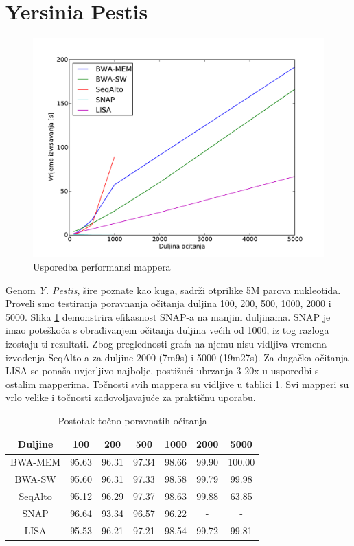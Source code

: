 \documentclass[times, utf8, diplomski]{fer}
\begin{document}
\section {Yersinia Pestis}

\begin{figure}[H]
\centering
\includegraphics[width=1.0\textwidth]{../img/yersinia-time.pdf}
\caption{Usporedba performansi mappera}\label{yersinia-time}
\end{figure}

Genom \emph{Y. Pestis}, šire poznate kao kuga, sadrži otprilike 5M parova nukleotida. Proveli smo testiranja poravnanja očitanja duljina 100, 200, 500, 1000, 2000 i 5000. Slika \ref{yersinia-time} demonstrira efikasnost SNAP-a na manjim duljinama. SNAP je imao poteškoća s obrađivanjem očitanja duljina većih od 1000, iz tog razloga izostaju ti rezultati. Zbog preglednosti grafa na njemu nisu vidljiva vremena izvođenja SeqAlto-a za duljine 2000 (7m9s) i 5000 (19m27s). Za dugačka očitanja LISA se ponaša uvjerljivo najbolje, postižući ubrzanja 3-20x u usporedbi s ostalim mapperima. Točnosti svih mappera su vidljive u tablici \ref{yersinia-correct}. Svi mapperi su vrlo velike i točnosti zadovoljavajuće za praktičnu uporabu.

\begin{table}[H]
\centering
\begin{tabular}{|c||c|c|c|c|c|c|}
\hline
	Duljine & 100 & 200 & 500 & 1000 & 2000 & 5000\\
\hline
\hline
	BWA-MEM & 95.63 & 96.31 & 97.34 & 98.66 & 99.90 & 100.00\\
\hline
	BWA-SW  & 95.60 & 96.31 & 97.33 & 98.58 & 99.79 & 99.98\\
\hline
	SeqAlto & 95.12 & 96.29 & 97.37 & 98.63 & 99.88 & 63.85\\
\hline
	SNAP    & 96.64 & 93.34 & 96.57 & 96.22 & - & -\\
\hline
	LISA    & 95.53 & 96.21 & 97.21 & 98.54 & 99.72 & 99.81\\
\hline
\end{tabular}
\caption{Postotak točno poravnatih očitanja}\label{yersinia-correct}
\end{table}
\end{document}

